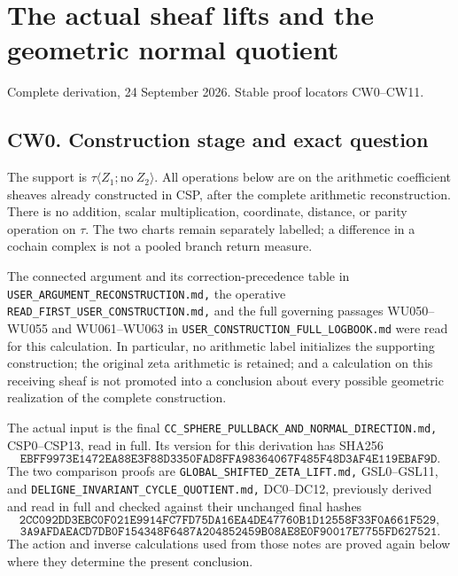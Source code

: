 \section{The actual sheaf lifts and the geometric normal
quotient}\label{the-actual-sheaf-lifts-and-the-geometric-normal-quotient}

Complete derivation, 24 September 2026. Stable proof locators CW0--CW11.

\subsection{CW0. Construction stage and exact
question}\label{cw0.-construction-stage-and-exact-question}

The support is \(\tau\langle Z_1;\mathrm{no}\ Z_2\rangle\). All
operations below are on the arithmetic coefficient sheaves already
constructed in CSP, after the complete arithmetic reconstruction. There
is no addition, scalar multiplication, coordinate, distance, or parity
operation on \(\tau\). The two charts remain separately labelled; a
difference in a cochain complex is not a pooled branch return measure.

The connected argument and its correction-precedence table in
\nolinkurl{USER_ARGUMENT_RECONSTRUCTION.md,} the operative
\nolinkurl{READ_FIRST_USER_CONSTRUCTION.md,} and the full governing
passages WU050--WU055 and WU061--WU063 in
\nolinkurl{USER_CONSTRUCTION_FULL_LOGBOOK.md} were read for this
calculation. In particular, no arithmetic label initializes the
supporting construction; the original zeta arithmetic is retained; and a
calculation on this receiving sheaf is not promoted into a conclusion
about every possible geometric realization of the complete construction.

The actual input is the final
\nolinkurl{CC_SPHERE_PULLBACK_AND_NORMAL_DIRECTION.md,} CSP0--CSP13,
read in full. Its version for this derivation has SHA256 \[
\texttt{EBFF9973E1472EA88E3F88D3350FAD8FFA98364067F485F48D3AF4E119EBAF9D}.
\] The two comparison proofs are
\nolinkurl{GLOBAL_SHIFTED_ZETA_LIFT.md,} GSL0--GSL11, and
\nolinkurl{DELIGNE_INVARIANT_CYCLE_QUOTIENT.md,} DC0--DC12, previously
derived and read in full and checked against their unchanged final
hashes \[
\texttt{2CC092DD3EBC0F021E9914FC7FD75DA16EA4DE47760B1D12558F33F0A661F529},
\] \[
\texttt{3A9AFDAEACD7DB0F154348F6487A204852459B08AE8E0F90017E7755FD627521}.
\] The action and inverse calculations used from those notes are proved
again below where they determine the present conclusion.

